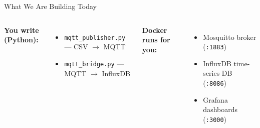 \documentclass[aspectratio=169,11pt]{beamer}
\begin{document}
\begin{frame}{What We Are Building Today}
    \vspace{-0.1cm}
    \begin{columns}
        \textbf{You write (Python):}
        \begin{itemize}
            \item \texttt{mqtt\_publisher.py} --- CSV $\rightarrow$ MQTT
            \item \texttt{mqtt\_bridge.py} --- MQTT $\rightarrow$ InfluxDB
        \end{itemize}

        \textbf{Docker runs for you:}
        \begin{itemize}
            \item Mosquitto broker (\texttt{:1883})
            \item InfluxDB time-series DB (\texttt{:8086})
            \item Grafana dashboards (\texttt{:3000})
        \end{itemize}
    \end{columns}
\end{frame}
\end{document}
